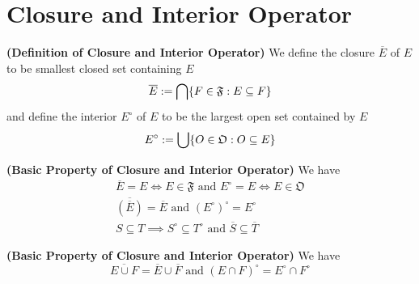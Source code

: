 \documentclass{report}
\begin{document}
\section{Closure and Interior Operator}
\begin{definition}
\label{4.2.1}
\textbf{(Definition of Closure and Interior Operator)} We define the closure $\overline{E}$ of $E$ to be smallest closed set containing $E$
\begin{equation}
  \overline{E}:=\bigcap \{ F\in\mathfrak{F}:E\subseteq F \}
\end{equation}
and define the interior $E^\circ$ of  $E$ to be the largest open set contained by  $E$ 
\begin{equation}
E^\circ :=\bigcup  \{ O\in\mathfrak{O}:O \subseteq E \}
\end{equation}
\end{definition}
\begin{theorem}
\label{4.2.2}
\textbf{(Basic Property of Closure and Interior Operator)} We have
\begin{gather}
  \overline{E}=E\iff E\in\mathfrak{F}\text{ and }E^\circ=E\iff E\in\mathfrak{O}\\
\overline{(\overline{E})}=\overline{E}\text{ and }(E^\circ)^\circ=E^\circ\\
  S\subseteq T \implies S^\circ \subseteq T^\circ\text{ and }\overline{S}\subseteq \overline{T}
\end{gather}
\end{theorem}
\begin{theorem}
\label{4.2.3}
\textbf{(Basic Property of Closure and Interior Operator)} We have 
\begin{equation}
   \overline{E\cup F}=\overline{E}\cup \overline{F}\text{ and }(E\cap F)^\circ=E^\circ \cap F^\circ
\end{equation}
\end{theorem}
\end{document}
